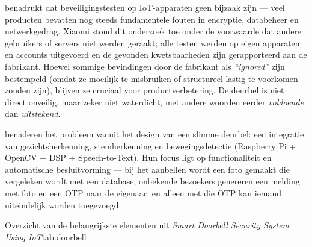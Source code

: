 \documentclass[nonacm, sigconf]{acmart}
\begin{document}
    \citeauthor{liu2021ethical} benadrukt dat beveiligingstesten op IoT-apparaten geen bijzaak zijn — veel producten bevatten nog steeds fundamentele fouten in encryptie, databeheer en netwerkgedrag.
    Xiaomi stond dit onderzoek toe onder de voorwaarde dat andere gebruikers of servers niet werden geraakt; alle testen werden op eigen apparaten en accounts uitgevoerd en de gevonden kwetsbaarheden zijn gerapporteerd aan de fabrikant.
    Hoewel sommige bevindingen door de fabrikant als \textit{``ignored''} zijn bestempeld (omdat ze moeilijk te misbruiken of structureel lastig te voorkomen zouden zijn), blijven ze cruciaal voor productverbetering.
    De deurbel is niet direct onveilig, maar zeker niet waterdicht, met andere woorden eerder \emph{voldoende} dan \emph{uitstekend}.

    \bigskip


    \parencite{chaudhari2020smart} benaderen het probleem vanuit het design van een slimme deurbel: een integratie van gezichtsherkenning, stemherkenning en bewegingsdetectie (Raspberry Pi + OpenCV + DSP + Speech-to-Text).
    Hun focus ligt op functionaliteit en automatische besluitvorming — bij het aanbellen wordt een foto gemaakt die vergeleken wordt met een database; onbekende bezoekers genereren een melding met foto en een OTP naar de eigenaar, en alleen met die OTP kan iemand uiteindelijk worden toegevoegd.

    \begin{SimpleTable}[s{0.5}s{1.5}]{Overzicht van de belangrijkste elementen uit \textit{Smart Doorbell Security System Using IoT}}{tab:doorbell}
    \end{SimpleTable}
\end{document}
